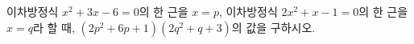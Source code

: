 이차방정식 $x^2+3x-6=0$의 한 근을 $x=p$, 이차방정식 $2x^2+x-1=0$의 한 근을 $x=q$라 할 때, $(2p^2+6p+1)(2q^2+q+3)$의 값을 구하시오.
